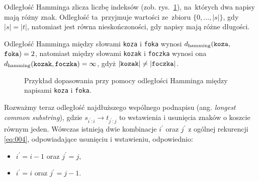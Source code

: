 \documentclass{praca1}
\begin{document}
Odległość Hamminga zlicza liczbę indeksów (zob. rys.~\ref{rys:002}), na~których dwa napisy mają różny znak. Odległość ta~przyjmuje wartości ze~zbioru $\{0,\ldots,|s|\}$, gdy $|s|=|t|$, natomiast jest równa nieskończoności, gdy napisy mają różne długości.

\begin{example}
Odległość Hamminga między słowami \verb|koza| i \verb|foka| wynosi $d_{\mathrm{hamming}}(\verb|koza|,$ $\verb|foka|) = 2$, natomiast między słowami \verb|kozak| i \verb|foczka| wynosi ona $d_{\mathrm{hamming}}(\verb|kozak|, \verb|foczka|) = \infty$, gdyż $|\verb|kozak| | \neq | \verb|foczka| |$.
\end{example}

\begin{figure}[width=80pt]
\centering
{}
\cprotect\caption{Przykład dopasowania przy pomocy odległości Hamminga między napisami \verb|koza| i \verb|foka|.}\label{rys:002}
\end{figure}



Rozważmy teraz odległość najdłuższego wspólnego podnapisu (ang. \emph{longest common substring}), gdzie $s_{i^\prime:i}\rightarrow t_{j^\prime:j}$ to wstawienia i usunięcia znaków o koszcie równym jeden. Wówczas istnieją dwie kombinacje $i^\prime$ oraz $j^\prime$ z ogólnej rekurencji \eqref{eq:004}, odpowiadające usunięciu i wstawieniu, odpowiednio:
\begin{itemize}
\item $i^\prime = i - 1$ oraz $j^\prime = j$,
\item $i^\prime = i$ oraz $j^\prime = j - 1$.
\end{itemize}
\end{document}
